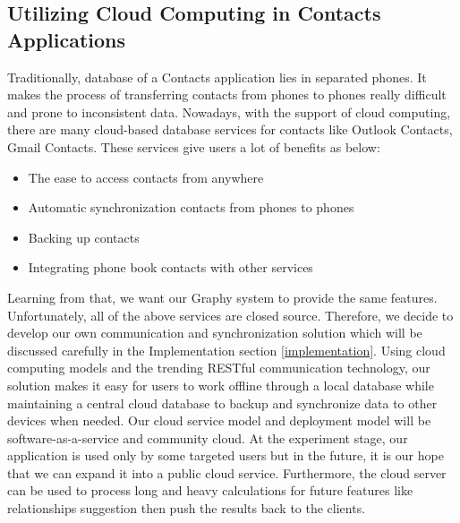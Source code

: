 \subsection{Utilizing Cloud Computing in Contacts Applications}
Traditionally, database of a Contacts application lies in separated phones. It makes the process of transferring contacts from phones to phones really difficult and prone to inconsistent data. Nowadays, with the support of cloud computing, there are many cloud-based database services for contacts like Outlook Contacts, Gmail Contacts. These services give users a lot of benefits as below:

\begin{itemize}
   \item The ease to access contacts from anywhere
   \item Automatic synchronization contacts from phones to phones
   \item Backing up contacts
   \item Integrating phone book contacts with other services
\end{itemize}

Learning from that, we want our Graphy system to provide the same features. Unfortunately, all of the above services are closed source. Therefore, we decide to develop our own communication and synchronization solution which will be discussed carefully in the Implementation section \ref{implementation}. Using cloud computing models and the trending RESTful communication technology, our solution makes it easy for users to work offline through a local database while maintaining a central cloud database to backup and synchronize data to other devices when needed. Our cloud service model and deployment model will be software-as-a-service and community cloud. At the experiment stage, our application is used only by some targeted users but in the future, it is our hope that we can expand it into a public cloud service. Furthermore, the cloud server can be used to process long and heavy calculations for future features like relationships suggestion then push the results back to the clients.




